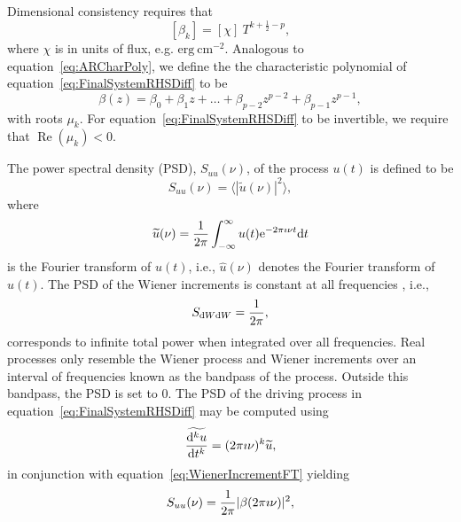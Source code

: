 \documentclass[a4paper,fleqn,usenatbib]{mnras}
\begin{document}
Dimensional consistency requires that 
\begin{equation}\label{eq:MAUnits}
[\beta_{k}] = [\chi]~T^{k+\frac{1}{2}-p},
\end{equation}
where $\chi$ is in units of flux, e.g. $\mathrm{erg}~\mathrm{cm}^{-2}$. Analogous to equation~\eqref{eq:ARCharPoly}, we define the the characteristic polynomial of equation~\eqref{eq:FinalSystemRHSDiff} to be
\begin{equation}\label{eq:MACharPoly}
\beta(z) = \beta_{0} + \beta_{1} z + \ldots + \beta_{p-2} z^{p-2} + \beta_{p-1} z^{p-1},
\end{equation}
with roots $\mu_{k}$. For equation~\eqref{eq:FinalSystemRHSDiff} to be invertible, we require that $\operatorname{Re}(\mu_{k}) < 0$.

The power spectral density (PSD), $S_{uu}(\nu)$, of the process $u(t)$ is defined to be
\begin{equation}\label{eq:PSD}
S_{uu}(\nu) = \langle |\widetilde{u}(\nu)|^{2} \rangle,
\end{equation}
where 
\begin{equation}\label{eq:FT}
\widetilde{u}(\nu) = \frac{1}{2\pi} \int_{-\infty}^{\infty}u(t)\mathrm{e}^{-2\pi \imath \nu t}\mathrm{d}t
\end{equation}
is the Fourier transform of $u(t)$, i.e., $\widehat{u}(\nu)$ denotes the Fourier transform of $u(t)$. The PSD of the Wiener increments is constant at all frequencies \citep{HandbookOfStatistics19Brockwell}, i.e.,
\begin{equation}\label{eq:WienerIncrementFT}
S_{\mathrm{d}W\mathrm{d}W} = \frac{1}{2 \pi},
\end{equation}
corresponds to infinite total power when integrated over all frequencies. Real processes only resemble the Wiener process and Wiener increments over an interval of frequencies known as the bandpass of the process. Outside this bandpass, the PSD is set to $0$. The PSD of the driving process in equation~\eqref{eq:FinalSystemRHSDiff} may be computed using 
\begin{equation}\label{eq:FTDerivative}
\widetilde{\frac{\mathrm{d}^{k}u}{\mathrm{d}t^{k}}} = (2 \pi \imath \nu)^{k}\widetilde{u},
\end{equation}
in conjunction with equation~\eqref{eq:WienerIncrementFT} yielding
\begin{equation}\label{eq:RHSPSD}
S_{uu}(\nu) = \frac{1}{2 \pi } |\beta(2 \pi \imath \nu)|^{2},
\end{equation}
\end{document}
